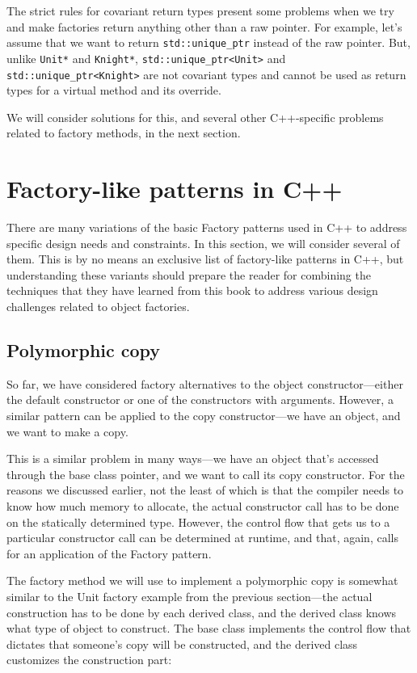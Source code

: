 The strict rules for covariant return types present some problems when we try and make factories return anything other than a raw pointer. For example, let's assume that we want to return \texttt{std::unique\_ptr} instead of the raw pointer. But, unlike \texttt{Unit*} and \texttt{Knight*}, \texttt{std::unique\_ptr\textless{}Unit\textgreater{}} and \texttt{std::unique\_ptr\textless{}Knight\textgreater{}} are not covariant types and cannot be used as return types for a virtual method and its override.

We will consider solutions for this, and several other C++-specific problems related to factory methods, in the next section.

\section{Factory-like patterns in C++}

There are many variations of the basic Factory patterns used in C++ to address specific design needs and constraints. In this section, we will consider several of them. This is by no means an exclusive list of factory-like patterns in C++, but understanding these variants should prepare the reader for combining the techniques that they have learned from this book to address various design challenges related to object factories.

\subsection{Polymorphic copy}

So far, we have considered factory alternatives to the object constructor---either the default constructor or one of the constructors with arguments. However, a similar pattern can be applied to the copy constructor---we have an object, and we want to make a copy.

This is a similar problem in many ways---we have an object that's accessed through the base class pointer, and we want to call its copy constructor. For the reasons we discussed earlier, not the least of which is that the compiler needs to know how much memory to allocate, the actual constructor call has to be done on the statically determined type. However, the control flow that gets us to a particular constructor call can be determined at runtime, and that, again, calls for an application of the Factory pattern.

The factory method we will use to implement a polymorphic copy is somewhat similar to the Unit factory example from the previous section---the actual construction has to be done by each derived class, and the derived class knows what type of object to construct. The base class implements the control flow that dictates that someone's copy will be constructed, and the derived class customizes the construction part:

